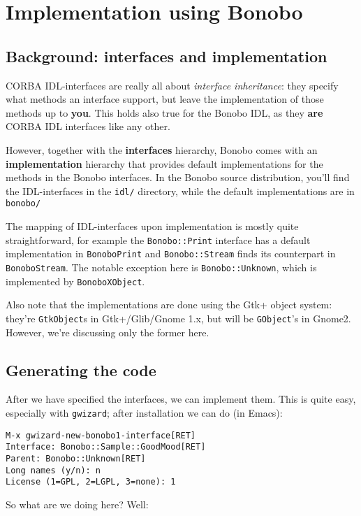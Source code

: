 \documentclass[final,10pt]{article}
\begin{document}
\section{Implementation using Bonobo}
\subsection{Background: interfaces and implementation}
CORBA IDL-interfaces are really all about {\em interface inheritance}:
they specify what methods an interface support, but leave the
implementation of those methods up to {\bf you}. This holds also true
for the Bonobo IDL, as they {\bf are} CORBA IDL interfaces like any
other.

However, together with the {\bf interfaces} hierarchy, Bonobo comes with an
{\bf implementation} hierarchy that provides default implementations for the
methods in the Bonobo interfaces. In the Bonobo source distribution, you'll
find the IDL-interfaces in the \verb|idl/| directory, while the
default implementations are in \verb|bonobo/|

The mapping of IDL-interfaces upon implementation is mostly quite
straightforward, for example the \verb|Bonobo::Print| interface has a
default implementation in \verb|BonoboPrint| and \verb|Bonobo::Stream|
finds its counterpart in \verb|BonoboStream|.  The notable exception here is
\verb|Bonobo::Unknown|, which is implemented by \verb|BonoboXObject|.

Also note that the implementations are done using the Gtk+ object
system: they're \verb|GtkObject|s in Gtk+/Glib/Gnome 1.x, but will be
\verb|GObject|'s in Gnome2. However, we're discussing only the former
here. 

\subsection{Generating the code}
After we have specified the interfaces, we can implement them. This is
quite easy, especially with \verb|gwizard|; after installation we can
do (in Emacs):
\begin{verbatim}
M-x gwizard-new-bonobo1-interface[RET]  
Interface: Bonobo::Sample::GoodMood[RET]
Parent: Bonobo::Unknown[RET]
Long names (y/n): n
License (1=GPL, 2=LGPL, 3=none): 1
\end{verbatim}
So what are we doing here? Well:
\end{document}
